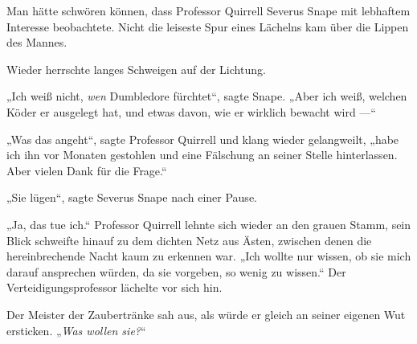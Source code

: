 Man hätte schwören können, dass Professor Quirrell Severus Snape mit lebhaftem Interesse beobachtete. Nicht die leiseste Spur eines Lächelns kam über die Lippen des Mannes.

Wieder herrschte langes Schweigen auf der Lichtung.

„Ich weiß nicht, \emph{wen} Dumbledore fürchtet“, sagte Snape.
„Aber ich weiß, welchen Köder er ausgelegt hat, und etwas davon, wie er wirklich bewacht wird —“

„Was das angeht“, sagte Professor Quirrell und klang wieder gelangweilt, „habe ich ihn vor Monaten gestohlen und eine Fälschung an seiner Stelle hinterlassen. Aber vielen Dank für die Frage.“

„Sie lügen“, sagte Severus Snape nach einer Pause.

„Ja, das tue ich.“ Professor Quirrell lehnte sich wieder an den grauen Stamm, sein Blick schweifte hinauf zu dem dichten Netz aus Ästen, zwischen denen die hereinbrechende Nacht kaum zu erkennen war.
„Ich wollte nur wissen, ob sie mich darauf ansprechen würden, da sie vorgeben, so wenig zu wissen.“ Der Verteidigungsprofessor lächelte vor sich hin.

Der Meister der Zaubertränke sah aus, als würde er gleich an seiner eigenen Wut ersticken.
„\emph{Was wollen sie?}“

